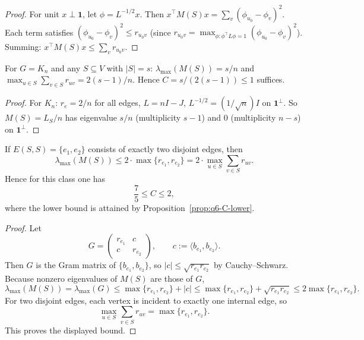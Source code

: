 \begin{proof}
For unit $x\perp\mathbf{1}$, let $\phi=L^{-1/2}x$.
Then $x^\top M(S)x=\sum_{v}(\phi_{u_0}-\phi_v)^2$.
Each term satisfies $(\phi_{u_0}-\phi_v)^2\le r_{u_0 v}$
(since $r_{u_0 v}=\max_{\phi:\phi^\top L\phi=1}(\phi_{u_0}-\phi_v)^2$).
Summing: $x^\top M(S)x\le\sum_v r_{u_0 v}$.
\end{proof}

\begin{proposition}\label{prop:q6-rdi-kn}
For $G=K_n$ and any $S\subseteq V$ with $|S|=s$:
$\lambda_{\max}(M(S))=s/n$ and
$\max_{u\in S}\sum_{v\in S}r_{uv}=2(s-1)/n$.
Hence $C=s/(2(s-1))\le 1$ suffices.
\end{proposition}

\begin{proof}
For $K_n$: $r_e=2/n$ for all edges, $L=nI-J$,
$L^{-1/2}=(1/\sqrt{n})I$ on $\mathbf{1}^\perp$.
So $M(S)=L_S/n$ has eigenvalue $s/n$ (multiplicity $s-1$)
and $0$ (multiplicity $n-s$) on $\mathbf{1}^\perp$.
\end{proof}

\begin{proposition}\label{prop:q6-rdi-match}
If $E(S,S)=\{e_1,e_2\}$ consists of exactly two disjoint edges, then
\[
\lambda_{\max}(M(S))
\le 2\cdot \max\{r_{e_1},r_{e_2}\}
=2\cdot\max_{u\in S}\sum_{v\in S}r_{uv}.
\]
Hence for this class one has
\[
\frac75 \le C \le 2,
\]
where the lower bound is attained by
Proposition~\ref{prop:q6-C-lower}.
\end{proposition}

\begin{proof}
Let
\[
G=\begin{pmatrix}
r_{e_1} & c\\
c & r_{e_2}
\end{pmatrix},
\qquad c:=\langle b_{e_1},b_{e_2}\rangle.
\]
Then $G$ is the Gram matrix of $\{b_{e_1},b_{e_2}\}$, so
$|c|\le \sqrt{r_{e_1}r_{e_2}}$ by Cauchy--Schwarz.
Because nonzero eigenvalues of $M(S)$ are those of $G$,
\[
\lambda_{\max}(M(S))
=\lambda_{\max}(G)
\le \max\{r_{e_1},r_{e_2}\}+|c|
\le \max\{r_{e_1},r_{e_2}\}+\sqrt{r_{e_1}r_{e_2}}
\le 2\max\{r_{e_1},r_{e_2}\}.
\]
For two disjoint edges, each vertex is incident to exactly one internal
edge, so
\[
\max_{u\in S}\sum_{v\in S}r_{uv}=\max\{r_{e_1},r_{e_2}\}.
\]
This proves the displayed bound.
\end{proof}

